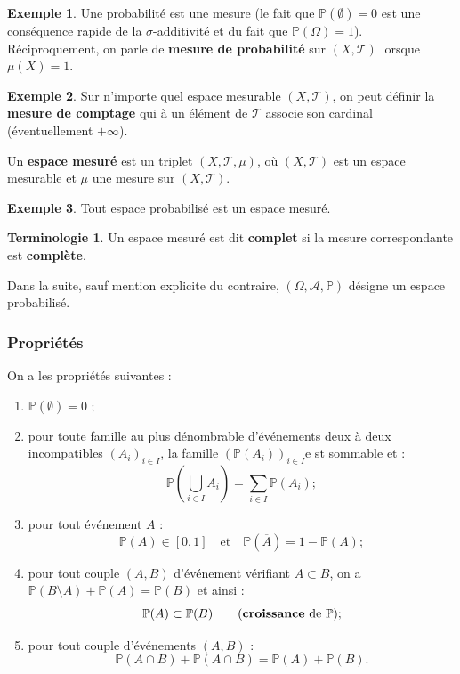\documentclass[french]{article}
\renewcommand{\P}{\mathbb{P}}
\theoremstyle{plain}
\theoremstyle{definition}
\newtheorem*{ex}{Exemple}
\newtheorem*{terminologie}{Terminologie}
\theoremstyle{remark}
\begin{document}
\begin{ex}
	Une probabilité est une mesure (le fait que $\P(\emptyset)=0$ est une conséquence rapide de la $\sigma$-additivité et du fait que $\P(\Omega)=1$). Réciproquement, on parle de \textbf{mesure de probabilité} sur $(X,\mathcal{T})$ lorsque $\mu(X)=1$.
\end{ex}

\begin{ex}
	Sur n'importe quel espace mesurable $(X,\mathcal{T})$, on peut définir la \textbf{mesure de comptage} qui à un élément de $\mathcal{T}$ associe son cardinal (éventuellement $+\infty$).
\end{ex}

\begin{dfn}
	Un \textbf{espace mesuré} est un triplet $(X,\mathcal{T},\mu)$, où $(X,\mathcal{T})$ est un espace mesurable et $\mu$ une mesure sur $(X,\mathcal{T})$.
\end{dfn}

\begin{ex}
	Tout espace probabilisé est un espace mesuré.
\end{ex}

\begin{terminologie}
	Un espace mesuré est dit \textbf{complet} si la mesure correspondante est \textbf{complète}.
\end{terminologie}

Dans la suite, sauf mention explicite du contraire, $(\Omega,\mathcal{A},\P)$ désigne un espace probabilisé.

\subsubsection*{Propriétés}

\begin{thm}%
	On a les propriétés suivantes :
	\begin{enumerate}
		\item $\P(\emptyset)=0$ ;
		\item pour toute famille au plus dénombrable d'événements deux à deux incompatibles $(A_i)_{i\in I}$, la famille $(\P(A_i))_{i\in I}$e st sommable et : $$\P\left(\bigcup_{i\in I}A_i\right)=\sum_{i\in I}\P(A_i);$$
		\item pour tout événement $A$ :
		$$\P(A)\in[0,1]\quad\text{et}\quad\P(\overline{A})=1-\P(A);$$
		\item pour tout couple $(A,B)$ d'événement vérifiant $A\subset B$, on a $\P(B\setminus A)+\P(A)=\P(B)$ et ainsi :
		$$\P(A)\subset\P(B)\quad\quad(\text{\textbf{croissance} de }\P);$$
		\item pour tout couple d'événements $(A,B)$ : $$\P(A\cap B)+\P(A\cap B)=\P(A)+\P(B).$$
	\end{enumerate}
\end{thm}
\end{document}

